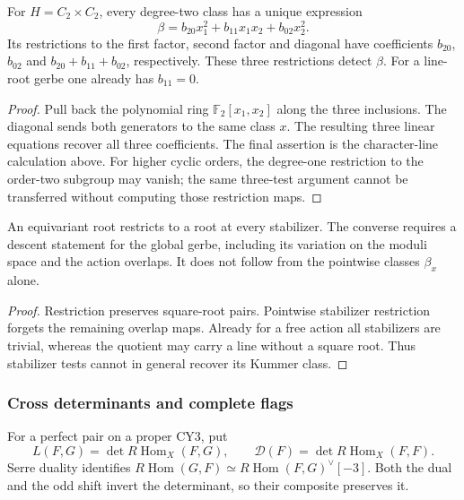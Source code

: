 \begin{proposition}
\label{prop:finite-stabilizer-klein-four-class}
\label{prop:finite-stabilizer-klein-four-b20}
\label{prop:finite-stabilizer-klein-four-b11}
\label{prop:finite-stabilizer-klein-four-b02}
\label{prop:finite-stabilizer-klein-four-zero-restrictions}
For \(H=C_2\times C_2\), every degree-two class has a unique expression
\[
 \beta=b_{20}x_1^2+b_{11}x_1x_2+b_{02}x_2^2.
\]
Its restrictions to the first factor, second factor and diagonal have
coefficients \(b_{20}\), \(b_{02}\) and
\(b_{20}+b_{11}+b_{02}\), respectively.  These three restrictions
detect \(\beta\).  For a line-root gerbe one already has
\(b_{11}=0\).
\end{proposition}
\begin{proof}
Pull back the polynomial ring \(\mathbb F_2[x_1,x_2]\) along the
three inclusions.  The diagonal sends both generators to the same
class \(x\).  The resulting three linear equations recover all three
coefficients.  The final assertion is the character-line calculation
above.  For higher cyclic orders, the degree-one restriction to the
order-two subgroup may vanish; the same three-test argument cannot
be transferred without computing those restriction maps.
\end{proof}

\begin{proposition}
\label{prop:finite-stabilizer-orientation-detection}
An equivariant root restricts to a root at every stabilizer.  The
converse requires a descent statement for the global gerbe, including
its variation on the moduli space and the action overlaps.  It does
not follow from the pointwise classes \(\beta_x\) alone.
\end{proposition}
\begin{proof}
Restriction preserves square-root pairs.  Pointwise stabilizer
restriction forgets the remaining overlap maps.  Already for a free
action all stabilizers are trivial, whereas the quotient may carry a
line without a square root.  Thus stabilizer tests cannot in general
recover its Kummer class.
\end{proof}

\subsubsection*{Cross determinants and complete flags}

For a perfect pair on a proper CY3, put
\[
 L(F,G)=\det R\operatorname{Hom}_X(F,G),\qquad
 \mathscr D(F)=\det R\operatorname{Hom}_X(F,F).
\]
Serre duality identifies
\(R\operatorname{Hom}(G,F)\simeq
R\operatorname{Hom}(F,G)^\vee[-3]\).  Both the dual and the odd shift
invert the determinant, so their composite preserves it.

